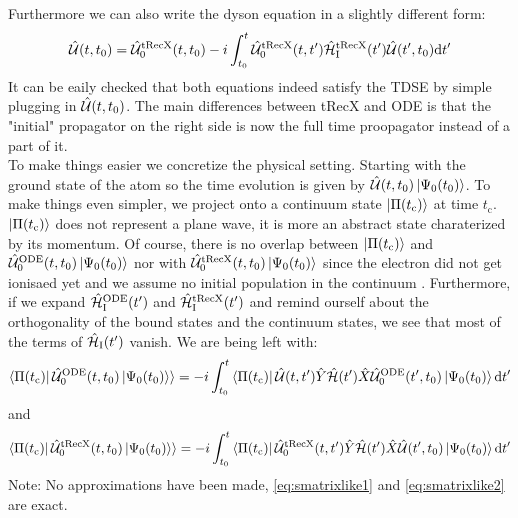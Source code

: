 Furthermore we can also write the dyson equation in a slightly different form:
\begin{equation}
    \hat{\mathcal{U}}(t,t_0)=\hat{\mathcal{U}}^{\mathrm{tRecX}}_0(t,t_0)-i\int_{t_0}^{t} \hat{\mathcal{U}}^{\mathrm{tRecX}}_0(t,t')\hat{\mathcal{H}}^{\mathrm{tRecX}}_{\mathrm{I}}(t')\hat{\mathcal{U}}(t',t_0) \mathrm{d} t'       \label{eq:dysonAnsatz}
\end{equation}
It can be eaily checked that both equations indeed satisfy the TDSE by simple plugging in $\hat{\mathcal{U}}(t,t_0)$.
The main differences between tRecX and ODE is that the "initial" propagator on the right side is now the full time proopagator instead of a part of it.\\

To make things easier we concretize the physical setting. 
Starting with the ground state of the atom so the time evolution is given by $\hat{\mathcal{U}}(t,t_0)\ket{\Psi_0(t_0)}$.
To make things even simpler, we project onto a continuum state $\ket{\Pi(t_{\mathrm{c}})}$ at time $t_{\mathrm{c}}$.
$\ket{\Pi(t_{\mathrm{c}})}$ does not represent a plane wave, it is more an abstract state charaterized by its momentum.
Of course, there is no overlap between $\ket{\Pi(t_{\mathrm{c}})}$ and $\hat{\mathcal{U}}^{\mathrm{ODE}}_0(t,t_0)\ket{\Psi_0(t_0)}$ nor with $\hat{\mathcal{U}}^{\mathrm{tRecX}}_0(t,t_0)\ket{\Psi_0(t_0)}$ since the electron did not get ionisaed yet and we assume no initial population in the continuum \cite{Ivanov20012005}. 
Furthermore, if we expand $\hat{\mathcal{H}}^{\mathrm{ODE}}_{\mathrm{I}}(t')$ and $\hat{\mathcal{H}}^{\mathrm{tRecX}}_{\mathrm{I}}(t')$ and remind ourself about the orthogonality of the bound states and the continuum states, we see that most of the terms of $\hat{\mathcal{H}}_{\mathrm{I}}(t')$ vanish.
We are being left with:
\begin{equation}
    \braket{\Pi(t_{\mathrm{c}})|\,\hat{\mathcal{U}}^{\mathrm{ODE}}_0(t,t_0)\ket{\Psi_0(t_0)}} = -i \int_{t_0}^{t} \bra{\Pi(t_{\mathrm{c}})} \hat{\mathcal{U}}(t,t')\hat{Y}\hat{\mathcal{H}}(t')\hat{X} \hat{\mathcal{U}}^{\mathrm{ODE}}_0(t',t_0)\ket{\Psi_0(t_0)} \mathrm{d} t' \label{eq:smatrixlike1}
\end{equation}
and
\begin{equation}
    \braket{\Pi(t_{\mathrm{c}})|\,\hat{\mathcal{U}}^{\mathrm{tRecX}}_0(t,t_0)\ket{\Psi_0(t_0)}} = -i \int_{t_0}^{t} \bra{\Pi(t_{\mathrm{c}})} \hat{\mathcal{U}}^{\mathrm{tRecX}}_0(t,t')\hat{Y}\hat{\mathcal{H}}(t')\hat{X} \hat{\mathcal{U}}(t',t_0)\ket{\Psi_0(t_0)} \mathrm{d} t' \label{eq:smatrixlike2}
\end{equation}
Note: No approximations have been made, \eqref{eq:smatrixlike1} and \eqref{eq:smatrixlike2} are exact.






